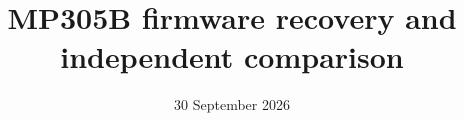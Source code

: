 

\title{MP305B firmware recovery and independent comparison}
\author{}
\date{30 September 2026}
\maketitle
\tableofcontents
\clearpage


